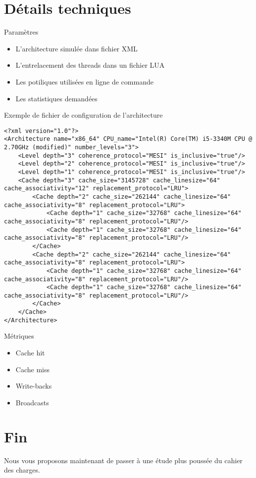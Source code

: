 \documentclass{beamer}
\begin{document}
\section{Détails techniques}
\begin{frame}
\begin{block}{Paramètres}
\begin{itemize}
  \item{L'architecture simulée dans fichier XML}
  \item{L'entrelacement des threads dans un fichier LUA}
  \item{Les potiliques utilisées en ligne de commande}
  \item{Les statistiques demandées}
\end{itemize}
\end{block}
\end{frame}

\begin{frame}[fragile]
Exemple de fichier de configuration de l'architecture
\begin{lstlisting}
<?xml version="1.0"?>
<Architecture name="x86_64" CPU_name="Intel(R) Core(TM) i5-3340M CPU @ 2.70GHz (modified)" number_levels="3">
    <Level depth="3" coherence_protocol="MESI" is_inclusive="true"/>
    <Level depth="2" coherence_protocol="MESI" is_inclusive="true"/>
    <Level depth="1" coherence_protocol="MESI" is_inclusive="true"/>
    <Cache depth="3" cache_size="3145728" cache_linesize="64" cache_associativity="12" replacement_protocol="LRU">
        <Cache depth="2" cache_size="262144" cache_linesize="64" cache_associativity="8" replacement_protocol="LRU">
            <Cache depth="1" cache_size="32768" cache_linesize="64" cache_associativity="8" replacement_protocol="LRU"/>
            <Cache depth="1" cache_size="32768" cache_linesize="64" cache_associativity="8" replacement_protocol="LRU"/>
        </Cache>
        <Cache depth="2" cache_size="262144" cache_linesize="64" cache_associativity="8" replacement_protocol="LRU">
            <Cache depth="1" cache_size="32768" cache_linesize="64" cache_associativity="8" replacement_protocol="LRU"/>
            <Cache depth="1" cache_size="32768" cache_linesize="64" cache_associativity="8" replacement_protocol="LRU"/>
        </Cache>
    </Cache>
</Architecture>
\end{lstlisting}
\end{frame}

\begin{frame}
\begin{block}{Métriques}
\begin{itemize}
  \item{Cache hit}
  \item{Cache miss}
  \item{Write-backs}
  \item{Broadcasts}
\end{itemize}
\end{block}
\end{frame}

\section*{Fin}
\begin{frame}
\begin{block}{}
Nous vous proposons maintenant de passer à une étude plus poussée du cahier des charges.
\end{block}
\end{frame}
\end{document}
